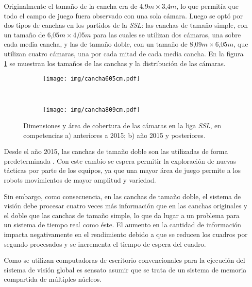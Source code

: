 Originalmente el tamaño de la cancha era de 4,9$m\times$3,4$m$, lo que permitía
que todo el campo de juego fuera observado con una sola cámara. Luego se optó
por dos tipos de canchas en los partidos de la \emph{SSL}: las canchas de tamaño
simple, con un tamaño de 6,05$m\times$4,05$m$ para las cuales se utilizan dos
cámaras, una sobre cada media cancha, y las de tamaño doble, con un tamaño de
8,09$m\times$6,05$m$, que utilizan cuatro cámaras, una por cada mitad de cada
media cancha. En la figura \ref{cancha} se muestran los tamaños de las canchas y
la distribución de las cámaras.

\begin{figure}[!htb]

	\centering

	\begin{subfigure}[!htb]{0.45\textwidth}
		\centering
		\texttt{[image: img/cancha605cm.pdf]}
		\caption{}
	\end{subfigure}
	~
	\begin{subfigure}[!htb]{0.45\textwidth}
		\centering
		\texttt{[image: img/cancha809cm.pdf]}
		\caption{}
	\end{subfigure}

	\caption{Dimensiones y área de cobertura de las cámaras en la liga
	\emph{SSL}, en competencias a) anteriores a 2015; b) año 2015 y
	posteriores.}

	\label{cancha}

\end{figure}

Desde el año 2015, las canchas de tamaño doble son las utilizadas de forma
predeterminada \cite{sslrules2015}. Con este cambio se espera permitir la
exploración de nuevas tácticas por parte de los equipos, ya que una mayor área
de juego permite a los robots movimientos de mayor amplitud y variedad.

Sin embargo, como consecuencia, en las canchas de tamaño doble, el sistema de
visión debe procesar cuatro veces más información que en las canchas
originales y el doble que las canchas de tamaño simple, lo que da lugar a un
problema para un sistema de tiempo real como éste. El aumento en la cantidad de
información impacta negativamente en el rendimiento debido a que se reducen los
cuadros por segundo procesados y se incrementa el tiempo de espera del cuadro.

Como se utilizan computadoras de escritorio convencionales para la ejecución
del sistema de visión global es sensato asumir que se trata de un sistema de
memoria compartida de múltiples núcleos.
